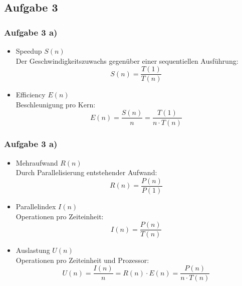 \documentclass[german,notes,18pt]{beamer}
\begin{document}
	\subsection{Aufgabe 3}
	\begin{frame}
		\frametitle{Aufgabe 3 a)}
		
		\begin{itemize}
			\item Speedup $S(n)$ \\
			Der Geschwindigkeitszuwachs gegenüber einer sequentiellen Ausführung:
			\begin{equation*}
				S(n)=\frac{T(1)}{T(n)}
			\end{equation*}
			\item Efficiency $E(n)$ \\
			Beschleunigung pro Kern:
			\begin{equation*}
				E(n)=\frac{S(n)}{n}=\frac{T(1)}{n\cdot T(n)}
			\end{equation*}
		\end{itemize}
	\end{frame}

	\begin{frame}
		\frametitle{Aufgabe 3 a)}
		
		\begin{itemize}
			\item Mehraufwand $R(n)$ \\
			Durch Parallelisierung entstehender Aufwand:
			\begin{equation*}
				R(n) = \frac{P(n)}{P(1)}
			\end{equation*}
			\item Parallelindex $I(n)$ \\
			Operationen pro Zeiteinheit:
			\begin{equation*}
				I(n)=\frac{P(n)}{T(n)}
			\end{equation*}
			\item Auslastung $U(n)$ \\
			Operationen pro Zeiteinheit und Prozessor:
			\begin{equation*}
			U(n) = \frac{I(n)}{n} = R(n) \cdot E(n) = \frac{P(n)}{n \cdot T(n)}
			\end{equation*}
		\end{itemize}
	\end{frame}
	
\end{document}
